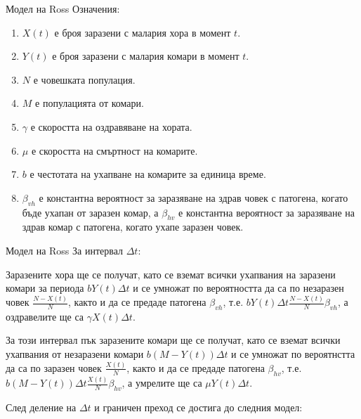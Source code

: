 \begin{frame}[t]{Модел на Ross}
  Означения:
  \begin{enumerate}
    \item $X(t)$ е броя заразени с малария хора в момент $t$.
    \item $Y(t)$ е броя заразени с малария комари в момент $t$.
    \item $N$ е човешката популация.
    \item $M$ е популацията от комари.
    \item $\gamma$ е скоростта на оздравяване на хората.
    \item $\mu$ е скоростта на смъртност на комарите.
    \item $b$ е честотата на ухапване на комарите за единица време.
    \item $\beta_{vh}$ е константна вероятност за заразяване на здрав човек с патогена, когато бъде ухапан от заразен комар, а $\beta_{hv}$ е константна вероятност за заразяване на здрав комар с патогена, когато ухапе заразен човек.
  \end{enumerate}
\end{frame}

\begin{frame}[t]{Модел на Ross}
  За интервал $\Delta t$:

  Заразените хора ще се получат, като се вземат всички ухапвания на заразени комари за периода $b Y(t) \Delta t$ и се умножат по вероятността да са по незаразен човек $\frac{N-X(t)}{N}$, както и да се предаде патогена $\beta_{vh}$, т.е. $b  Y(t) \Delta t \frac{N-X(t)}{N} \beta_{vh} $, а оздравелите ще са $\gamma X(t) \Delta t$.

  За този интервал пък заразените комари ще се получат, като се вземат всички ухапвания от незаразени комари $b (M - Y(t)) \Delta t$ и се умножат по вероятнстта да са по заразен човек $\frac{X(t)}{N}$, както и да се предаде патогена $\beta_{hv}$, т.е. $b (M - Y(t)) \Delta t \frac{X(t)}{N} \beta_{hv} $, а умрелите ще са $\mu Y(t) \Delta t$.

  След деление на $\Delta t$ и граничен преход се достига до следния модел:
\end{frame}


